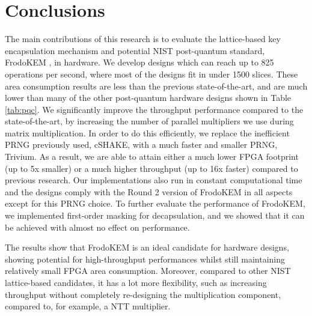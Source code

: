 \section{Conclusions}\label{sec:conclusions}

The main contributions of this research is to evaluate the lattice-based key encapsulation mechanism and potential NIST post-quantum standard, FrodoKEM \cite{frodokem}, in hardware. We develop designs which can reach up to 825 operations per second, where most of the designs fit in under 1500 slices. These area consumption results are less than the previous state-of-the-art, and are much lower than many of the other post-quantum hardware designs shown in Table \ref{tab:pqc}. We significantly improve the throughput performance compared to the state-of-the-art, by increasing the number of parallel multipliers we use during matrix multiplication. In order to do this efficiently, we replace the inefficient PRNG previously used, cSHAKE, with a much faster and smaller PRNG, Trivium. As a result, we are able to attain either a much lower FPGA footprint (up to 5x smaller) or a much higher throughput (up to 16x faster) compared to previous research. Our implementations also run in constant computational time and the designs comply with the Round 2 version of FrodoKEM in all aspects except for this PRNG choice. To further evaluate the performance of FrodoKEM, we implemented first-order masking for decapsulation, and we showed that it can be achieved with almost no effect on performance.

The results show that FrodoKEM is an ideal candidate for hardware designs, showing potential for high-throughput performances whilst still maintaining relatively small FPGA area consumption. Moreover, compared to other NIST lattice-based candidates, it has a lot more flexibility, such as increasing throughput without completely re-designing the multiplication component, compared to, for example, a NTT multiplier.

